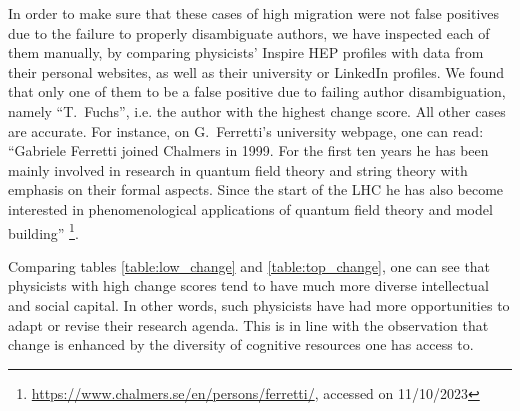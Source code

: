 \documentclass{article}
\begin{document}
In order to make sure that these cases of high migration were not false positives due to the failure to properly disambiguate authors, we have inspected each of them manually, by comparing physicists' Inspire HEP profiles with data from their personal websites, as well as their university or LinkedIn profiles. We found that only one of them to be a false positive due to failing author disambiguation, namely ``T.~Fuchs'', i.e. the author with the highest change score. All other cases are accurate.
For instance, on G.~Ferretti's university webpage, one can read: ``Gabriele Ferretti joined Chalmers in 1999. For the first ten years he has been mainly involved in research in quantum field theory and string theory with emphasis on their formal aspects. Since the start of the LHC he has also become interested in phenomenological applications of quantum field theory and model building'' \footnote{\url{https://www.chalmers.se/en/persons/ferretti/}, accessed on 11/10/2023}.

Comparing tables \ref{table:low_change} and \ref{table:top_change}, one can see that physicists with high change scores tend to have much more diverse intellectual and social capital. In other words, such physicists have had more opportunities to adapt or revise their research agenda. This is in line with the observation that change is enhanced by the diversity of cognitive resources one has access to.

\fontsize{6}{7}\selectfont\normalsize
\fontsize{6}{7}\selectfont\normalsize



\end{document}
